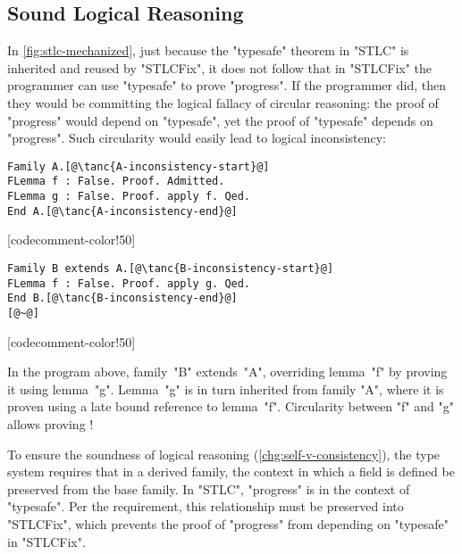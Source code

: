 \subsection{Sound Logical Reasoning}
\label{sec:sound}


In \cref{fig:stlc-mechanized}, just because the "typesafe" theorem in
"STLC" is inherited and reused by "STLCFix", it does not follow that
in "STLCFix" the programmer can use "typesafe" to prove "progress".
If the programmer did, then they would be committing the logical fallacy
of circular reasoning: the proof of "progress" would depend on "typesafe",
yet the proof of "typesafe" depends on "progress".
%
Such circularity would easily lead to logical inconsistency:

\begin{centered}
\begin{minipage}{36ex}
\begin{lstlisting}[basicstyle=\fontsize{8.25}{9}\ttfamily]
Family A.[@\tanc{A-inconsistency-start}@]
FLemma f : False. Proof. Admitted.
FLemma g : False. Proof. apply f. Qed.
End A.[@\tanc{A-inconsistency-end}@]
\end{lstlisting}
\end{minipage}
[codecomment-color!50]
\hspace{3.5em}
\begin{minipage}{36ex}
\begin{lstlisting}[basicstyle=\fontsize{8.25}{9}\ttfamily]
Family B extends A.[@\tanc{B-inconsistency-start}@]
FLemma f : False. Proof. apply g. Qed.
End B.[@\tanc{B-inconsistency-end}@]
[@~@]
\end{lstlisting}
\end{minipage}
[codecomment-color!50]
\end{centered}

\noindent
In the program above, family~"B" extends~"A", overriding lemma~"f" by
proving it using lemma~"g".
Lemma~"g" is in turn inherited from family "A", where it is proven using
a late bound reference to lemma~"f".
Circularity between "f" and "g" allows proving !

To ensure the soundness of logical reasoning (\ref{chg:self-v-consistency}),
the type system requires that in a derived family, the context in which
a field is defined be preserved from the base family.
In "STLC", "progress" is in the context of "typesafe".
Per the requirement, this relationship must be preserved into
"STLCFix", which prevents the proof of "progress" from depending on
"typesafe" in "STLCFix".

